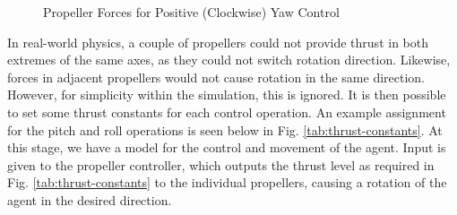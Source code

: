 \documentclass[12pt]{article}
\begin{document}
\begin{figure}[ht]
    \centering
    \caption{Propeller Forces for Positive (Clockwise) Yaw Control}
    \label{fig:quadcopter-yaw}
\end{figure}

In real-world physics, a couple of propellers could not provide thrust in both extremes of the same axes, as they could not switch rotation direction. Likewise, forces in adjacent propellers would not cause rotation in the same direction. However, for simplicity within the simulation, this is ignored. It is then possible to set some thrust constants for each control operation. An example assignment for the pitch and roll operations is seen below in Fig. \ref{tab:thrust-constants}. At this stage, we have a model for the control and movement of the agent. Input is given to the propeller controller, which outputs the thrust level as required in Fig. \ref{tab:thrust-constants} to the individual propellers, causing a rotation of the agent in the desired direction.
\end{document}
